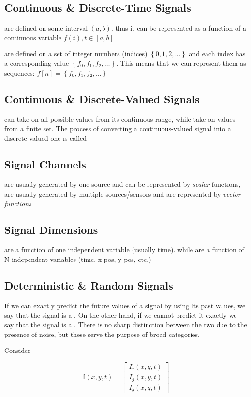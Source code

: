 \subsection*{Continuous \& Discrete-Time Signals}

 are defined on some interval $(a,b)$, thus it can be represented as a function of a continuous variable $f\left( t \right) , t\in\left[ a,b\right]$

 are defined on a set of integer numbers (indices) $\left\{ 0,1,2,\ldots \right\}$ and each index has a corresponding value $\left\{ f_0,f_1,f_2,\ldots \right\}$. This means that we can represent them as sequences: $f\left[ n\right] = \left\{ f_0,f_1,f_2,\ldots \right\}$

\subsection*{Continuous \& Discrete-Valued Signals}

 can take on all-possible values from its continuous range, while
 take on values from a finite set. The process of converting a continuous-valued signal into a discrete-valued one is called 

\subsection*{Signal Channels}
 are usually generated by one source and can be represented by \emph{scalar} functions,  are usually generated by multiple sources/sensors and are represented by \emph{vector functions}

\subsection*{Signal Dimensions}

 are a function of one independent variable (usually time). while  are a function of N independent variables (time, x-pos, y-pos, etc.)

\subsection*{Deterministic \& Random Signals}

If we can exactly predict the future values of a signal by using its past values, we say that the signal is a . On the other hand, if we cannot predict it exactly we say that the signal is a . There is no sharp distinction between the two due to the presence of noise, but these serve the purpose of broad categories.

Consider

\begin{displaymath}
	\mathbb{I}\left( x,y,t \right) = \begin{bmatrix}
	I_r\left(x,y,t\right) \\ I_g\left(x,y,t\right) \\ I_b\left(x,y,t\right)
	\end{bmatrix}
\end{displaymath}

	 
